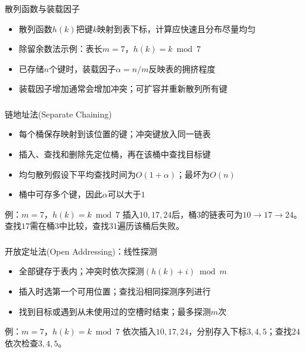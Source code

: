 \begin{frame}
    \frametitle{\insertsectionhead}
    \begin{block}{散列函数与装载因子}
        \begin{itemize}
            \item 散列函数$h(k)$把键$k$映射到表下标，计算应快速且分布尽量均匀
            \item 除留余数法示例：表长$m=7$，$h(k)=k\bmod 7$
            \item 已存储$n$个键时，装载因子$\alpha=n/m$反映表的拥挤程度
            \item 装载因子增加通常会增加冲突；可扩容并重新散列所有键
        \end{itemize}
    \end{block}
\end{frame}

\begin{frame}
    \frametitle{\insertsectionhead}
    \begin{block}{链地址法(Separate Chaining)}
        \begin{itemize}
            \item 每个桶保存映射到该位置的键；冲突键放入同一链表
            \item 插入、查找和删除先定位桶，再在该桶中查找目标键
            \item 均匀散列假设下平均查找时间为$O(1+\alpha)$；最坏为$O(n)$
            \item 桶中可存多个键，因此$\alpha$可以大于$1$
        \end{itemize}
    \end{block}
    \begin{exampleblock}{例：$m=7$，$h(k)=k\bmod 7$}
        插入$10,17,24$后，桶$3$的链表可为$10\rightarrow17\rightarrow24$。
        查找$17$需在桶$3$中比较，查找$31$遍历该桶后失败。
    \end{exampleblock}
\end{frame}

\begin{frame}
    \frametitle{\insertsectionhead}
    \begin{block}{开放定址法(Open Addressing)：线性探测}
        \begin{itemize}
            \item 全部键存于表内；冲突时依次探测$(h(k)+i)\bmod m$
            \item 插入时选第一个可用位置；查找沿相同探测序列进行
            \item 找到目标或遇到从未使用过的空槽时结束；最多探测$m$次
        \end{itemize}
    \end{block}
    \begin{exampleblock}{例：$m=7$，$h(k)=k\bmod 7$}
        依次插入$10,17,24$，分别存入下标$3,4,5$；查找$24$依次检查$3,4,5$。
    \end{exampleblock}
\end{frame}

